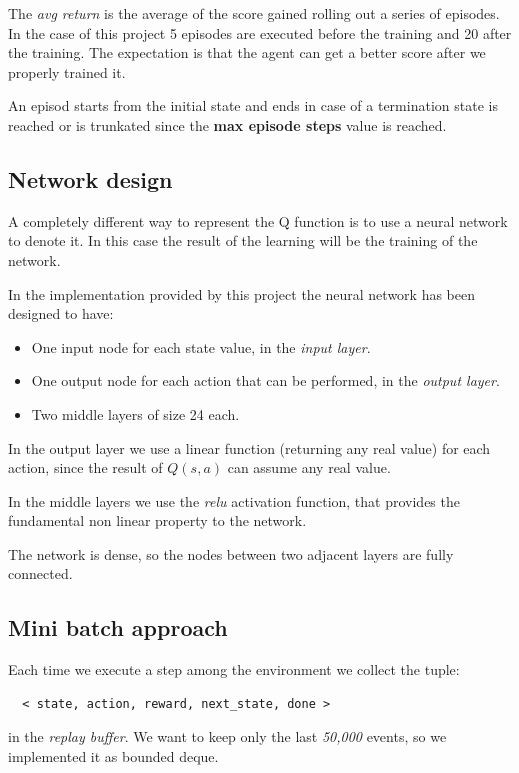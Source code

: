 \documentclass{article}
\begin{document}
The \emph{avg return} is the average of the score gained rolling out a series of episodes.
In the case of this project 5 episodes are executed before the training and 20 after the training.
The expectation is that the agent can get a better score after we properly trained it.

An episod starts from the initial state and ends in case of a termination state is reached or is trunkated since 
the \textbf{max episode steps} value is reached.

\subsection{Network design}

A completely different way to represent the Q function is to use a neural network to denote it.
In this case the result of the learning will be the training of the network.

In the implementation provided by this project the neural network has been designed to have:
\begin{itemize}
  \item One input node for each state value, in the \emph{input layer}.
  \item One output node for each action that can be performed, in the \emph{output layer}.
  \item Two middle layers of size 24 each.
\end{itemize}

In the output layer we use a linear function (returning any real value) for each action,
since the result of $Q(s,a)$ can assume any real value.

In the middle layers we use the \emph{relu} activation function, that provides the fundamental 
non linear property to the network.

The network is dense, so the nodes between two adjacent layers are fully connected.

\subsection{Mini batch approach}

Each time we execute a step among the environment we collect the tuple:

\begin{verbatim}
  < state, action, reward, next_state, done >
\end{verbatim}

in the \emph{replay buffer}.
We want to keep only the last \emph{50,000} events, so we implemented it as bounded deque.
\end{document}
